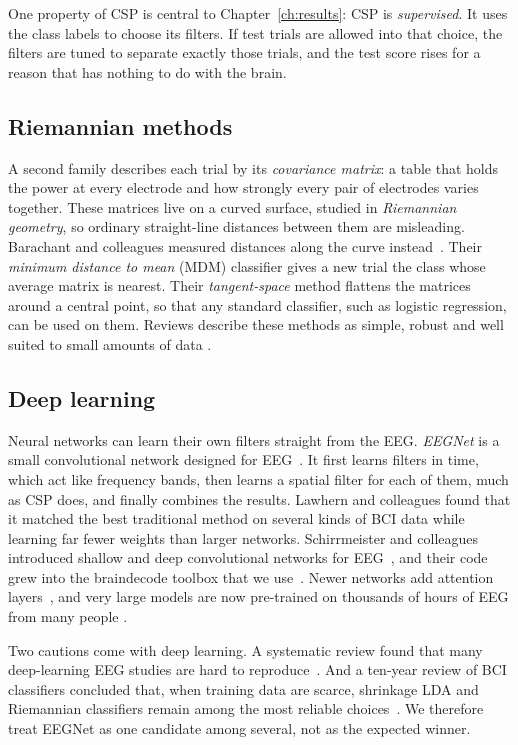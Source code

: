 One property of CSP is central to Chapter~\ref{ch:results}: CSP is \emph{supervised}. It
uses the class labels to choose its filters. If test trials are allowed into that choice,
the filters are tuned to separate exactly those trials, and the test score rises for a
reason that has nothing to do with the brain.

\subsection{Riemannian methods}

A second family describes each trial by its \emph{covariance matrix}: a table that holds the
power at every electrode and how strongly every pair of electrodes varies together. These
matrices live on a curved surface, studied in \emph{Riemannian geometry}, so ordinary
straight-line distances between them are misleading. Barachant and colleagues measured
distances along the curve instead~\cite{barachant2012}. Their \emph{minimum distance to mean}
(MDM) classifier gives a new trial the class whose average matrix is nearest. Their
\emph{tangent-space} method flattens the matrices around a central point, so that any
standard classifier, such as logistic regression, can be used on them. Reviews describe
these methods as simple, robust and well suited to small amounts of data
\cite{congedo2017,yger2017}.

\subsection{Deep learning}

Neural networks can learn their own filters straight from the EEG. \emph{EEGNet} is a small
convolutional network designed for EEG~\cite{lawhern2018}. It first learns filters in time,
which act like frequency bands, then learns a spatial filter for each of them, much as CSP
does, and finally combines the results. Lawhern and colleagues found that it matched the
best traditional method on several kinds of BCI data while learning far fewer weights than
larger networks. Schirrmeister and colleagues introduced shallow and deep convolutional
networks for EEG~\cite{schirrmeister2017}, and their code grew into the braindecode toolbox
that we use~\cite{braindecode}. Newer networks add attention layers~\cite{song2023conformer},
and very large models are now pre-trained on thousands of hours of EEG from many people
\cite{kostas2021bendr,jiang2024labram,wang2025cbramod}.

Two cautions come with deep learning. A systematic review found that many deep-learning EEG
studies are hard to reproduce~\cite{roy2019}. And a ten-year review of BCI classifiers
concluded that, when training data are scarce, shrinkage LDA and Riemannian classifiers
remain among the most reliable choices~\cite{lotte2018review}. We therefore treat EEGNet as
one candidate among several, not as the expected winner.

